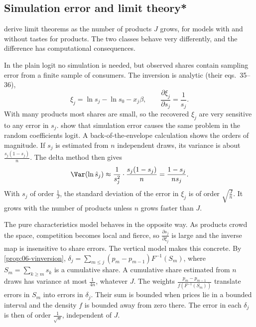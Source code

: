 \subsection{Simulation error and limit theory*}\label{sec:06-bp-simerror}

\citet{BerryLintonPakes2004} derive limit theorems as the number of products $J$ grows, for models with and without
tastes for products. The two classes behave very differently, and the difference has computational consequences.

In the plain logit no simulation is needed, but observed shares contain sampling error from a finite sample of
consumers. The inversion is analytic (their eqs.~35--36),
\begin{equation}\label{eq:06-logit-inv-sens}
  \xi_j = \ln s_j - \ln s_0 - x_j \beta , \qquad \frac{\partial \xi_j}{\partial s_j} = \frac{1}{s_j} .
\end{equation}
With many products most shares are small, so the recovered $\xi_j$ are very sensitive to any error in $s_j$.
\citet{BerryLintonPakes2004} show that simulation error causes the same problem in the random coefficients logit. A
back-of-the-envelope calculation shows the orders of magnitude. If $s_j$ is estimated from $n$ independent draws, its
variance is about $\frac{s_j(1 - s_j)}{n}$. The delta method then gives
\begin{equation*}
  \Var(\ln \hat s_j) \approx \frac{1}{s_j^2}\cdot\frac{s_j(1 - s_j)}{n} = \frac{1 - s_j}{n s_j} .
\end{equation*}
With $s_j$ of order $\frac{1}{J}$, the standard deviation of the error in $\xi_j$ is of order $\sqrt{\frac{J}{n}}$. It grows
with the number of products unless $n$ grows faster than $J$.

The pure characteristics model behaves in the opposite way. As products crowd the space, competition becomes local and
fierce, so $\frac{\partial s_j}{\partial \xi_j}$ is large and the inverse map is insensitive to share errors. The
vertical model makes this concrete. By \cref{prop:06-vinversion}, $\delta_j = \sum_{m \le j} (p_m - p_{m-1})
F^{-1}(S_m)$, where $S_m = \sum_{k \ge m} s_k$ is a cumulative share. A cumulative share estimated from $n$ draws has
variance at most $\frac{1}{4n}$, whatever $J$. The weights $\frac{p_m - p_{m-1}}{f(F^{-1}(S_m))}$ translate errors
in $S_m$ into errors in $\delta_j$. Their sum is bounded when prices lie in a bounded interval and the density $f$ is
bounded away from zero there. The error in each $\delta_j$ is then of order $\frac{1}{\sqrt n}$, independent of $J$.

